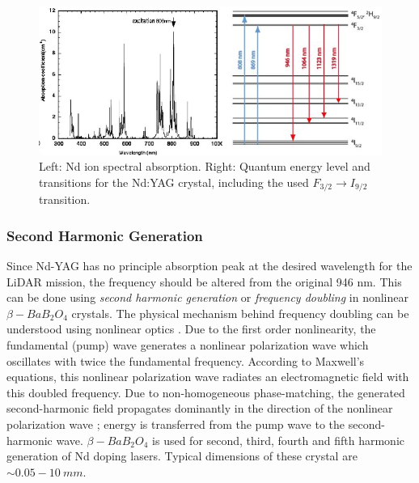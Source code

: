 \begin{figure} [ht]
\centering
\includegraphics[scale=0.7]{chapters/img/laser_line.png}	
\caption{Left: Nd ion spectral absorption. Right: Quantum energy level and transitions for the Nd:YAG crystal, including the used $F_{3/2}\rightarrow I_{9/2}$ transition. }
\label{laser}
\end{figure}

\subsubsection{Second Harmonic Generation}
\label{SHG}
Since Nd-YAG has no principle absorption peak at the desired wavelength for the \acs{LiDAR} mission, the frequency should be altered from the original 946 nm. This can be done using \textit{second harmonic generation} or \textit{frequency doubling} in nonlinear $\beta-BaB_{2}O_{4}$ crystals. The physical mechanism behind frequency doubling can be understood using nonlinear optics \cite{lasertech}. Due to the first order nonlinearity, the fundamental (pump) wave generates a nonlinear polarization wave which oscillates with twice the fundamental frequency. According to Maxwell's equations, this nonlinear polarization wave radiates an electromagnetic field with this doubled frequency. Due to non-homogeneous phase-matching, the generated second-harmonic field propagates dominantly in the direction of the nonlinear polarization wave \cite{algaasdiodes}; energy is transferred from the pump wave to the second-harmonic wave. $\beta-BaB_{2}O_{4}$ is used for second, third, fourth and fifth harmonic generation of Nd doping \acp{laser}. Typical dimensions of these crystal are $\sim0.05 - 10\ mm$.

